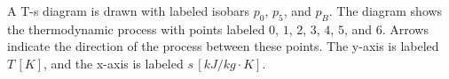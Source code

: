 A T-s diagram is drawn with labeled isobars \( p_0 \), \( p_5 \), and \( p_B \). The diagram shows the thermodynamic process with points labeled \( 0 \), \( 1 \), \( 2 \), \( 3 \), \( 4 \), \( 5 \), and \( 6 \). Arrows indicate the direction of the process between these points. The y-axis is labeled \( T \, [K] \), and the x-axis is labeled \( s \, [kJ/kg·K] \).